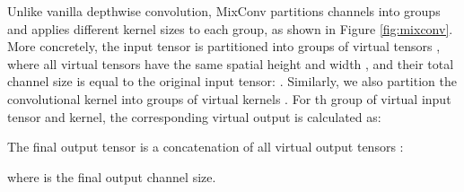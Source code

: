 \documentclass{sty/bmvc2k}
\begin{document}
Unlike vanilla depthwise convolution, MixConv partitions channels into groups and applies different kernel sizes to each group, as shown in Figure \ref{fig:mixconv}. More concretely, the input tensor is partitioned into  groups of virtual tensors , where all virtual tensors  have the same spatial height  and width , and their total channel size is equal to the original input tensor:  . Similarly, we also partition the convolutional kernel into  groups of virtual kernels . For th group of virtual input tensor and kernel, the corresponding virtual output is calculated as:



\noindent The final output tensor is a concatenation of all virtual output tensors :





\noindent where  is the final output channel size.


\end{document}
